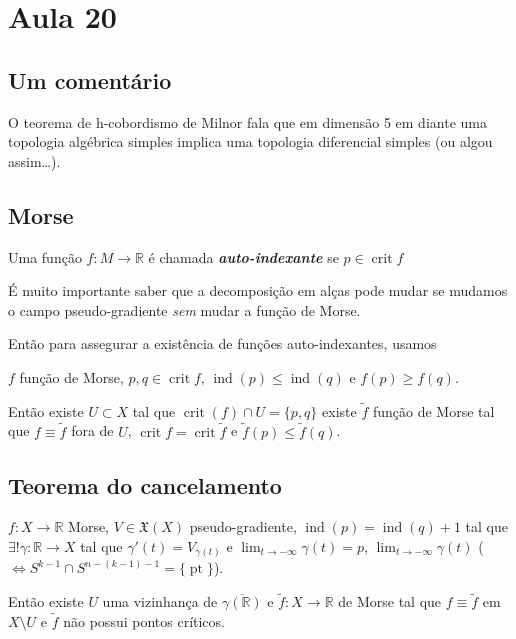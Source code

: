 \section{Aula 20}

\subsection{Um comentário}

O teorema de h-cobordismo de Milnor fala que em dimensão 5 em diante uma topologia algébrica simples implica uma topologia diferencial simples (ou algou assim…).

\subsection{Morse}

\begin{defn}\leavevmode
Uma função \(f : M \to \mathbb{R}\) é chamada \textit{\textbf{auto-indexante}} se \(p \in \operatorname{crit} f\)
\end{defn}

\begin{remark}\leavevmode
É muito importante saber que a decomposição em alças pode mudar se mudamos o campo pseudo-gradiente \textit{sem} mudar a função de Morse.
\end{remark}

Então para assegurar a existência de funções auto-indexantes, usamos

\begin{thm}\leavevmode
\(f\) função de Morse, \(p, q \in \operatorname{crit}f\), \(\operatorname{ind}(p)\leq \operatorname{ind}(q)\) e \(f(p) \geq  f(q)\).

Então existe \(U \subset X\) tal que \(\operatorname{crit}(f) \cap U=\{ p,q\}\) existe \(\tilde{f}\) função de Morse tal que \(f \equiv \tilde{f}\) fora de \(U\), \(\operatorname{crit} f=\operatorname{crit}\tilde{f}\) e \(\tilde{f}(p) \leq  \tilde{f}(q)\).
\end{thm}

\subsection{Teorema do cancelamento}

\begin{thm}[do cancelamento]\leavevmode
\(f : X \to \mathbb{R}\) Morse, \(V \in \mathfrak{X}(X)\) pseudo-gradiente, \(\operatorname{ind}(p) = \operatorname{ind} (q)+1\) tal que \(\exists !\gamma: \mathbb{R} \to X\) tal que \(\gamma'(t)=V_{\gamma(t)}\) e \(\lim_{t \to -\infty} \gamma(t)=p\), \(\lim_{t \to -\infty} \gamma(t)\) (\(\iff S^{k-1}\cap S^{n-(k-1)-1}=\{\operatorname{pt}\}\)).

Então existe \(U\) uma vizinhança de \(\overline{\gamma(\mathbb{R})}\) e \(\tilde{f}:X \to \mathbb{R}\) de Morse tal que \(f \equiv \tilde{f}\) em \(X\setminus U\) e \(\tilde{f}\) não possui pontos críticos.
\end{thm}

